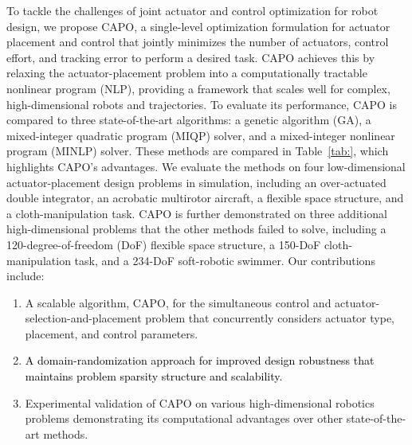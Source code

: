 \documentclass[runningheads]{llncs}
\newcommand{\todo}[1]{\textcolor{red}{TODO: #1}}
\newcommand{\changes}[1]{\textcolor{black}{#1}}
\begin{document}
To tackle the challenges of joint actuator and control optimization for robot design, we propose CAPO, a single-level optimization formulation for actuator placement and control that jointly minimizes the number of actuators, control effort, and tracking error to perform a desired task. CAPO achieves this by relaxing the actuator-placement problem into a computationally tractable nonlinear program (NLP), providing a framework that scales well for complex, high-dimensional robots and trajectories. To evaluate its performance, CAPO is compared to three state-of-the-art algorithms: a genetic algorithm (GA)\cite{wildart2022}, a mixed-integer quadratic program (MIQP) solver\cite{gurobi}, and a mixed-integer nonlinear program (MINLP) solver\cite{juniper}. These methods are compared in Table~\ref{tab:}, which highlights CAPO's advantages. We evaluate the methods on four low-dimensional actuator-placement design problems in simulation, including an over-actuated double integrator, an acrobatic multirotor aircraft, a flexible space structure, and a cloth-manipulation task. CAPO is further demonstrated on three additional high-dimensional problems that the other methods failed to solve, including a 120-degree-of-freedom (DoF) flexible space structure, a 150-DoF cloth-manipulation task, and a 234-DoF soft-robotic swimmer.
Our contributions include: %
\begin{enumerate}
\item A scalable algorithm, CAPO, for the simultaneous control and actuator-selection-and-placement problem that concurrently considers actuator type, placement, and control parameters.
\item \changes{A domain-randomization approach for improved design robustness that maintains problem sparsity structure and scalability.}
\item Experimental validation of CAPO on various high-dimensional robotics problems demonstrating its computational advantages over other state-of-the-art methods.
\end{enumerate}
\end{document}
